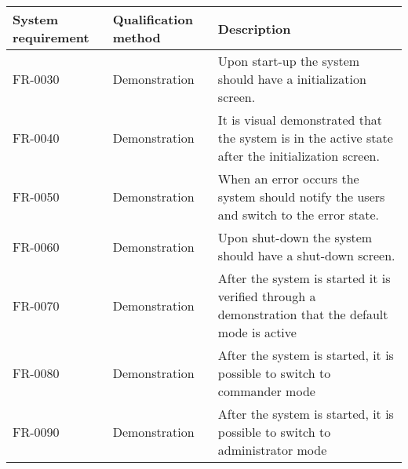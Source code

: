 \begin{table}[H]
\centering
\begin{tabular}{|l|l|p{6cm}|}
\hline
 \textbf{System requirement} & \textbf{Qualification method} & \textbf{Description} \\ \hline
 FR-0030 & Demonstration & Upon start-up the system should have a initialization screen.   \\  \hline
 FR-0040 & Demonstration & It is visual demonstrated that the system is in the active state after the initialization screen.   \\  \hline 
 FR-0050 & Demonstration & When an error occurs the system should notify the users and switch to the error state.\\  \hline
 FR-0060 & Demonstration & Upon shut-down the system should have a shut-down screen.\\  \hline
 FR-0070 & Demonstration & After the system is started it is verified through a demonstration that the default mode is active \\  \hline
 FR-0080 & Demonstration & After the system is started, it is possible to switch to commander mode \\  \hline
 FR-0090 & Demonstration & After the system is started, it is possible to switch to administrator mode\\  \hline 
  

\end{tabular}
\end{table}
